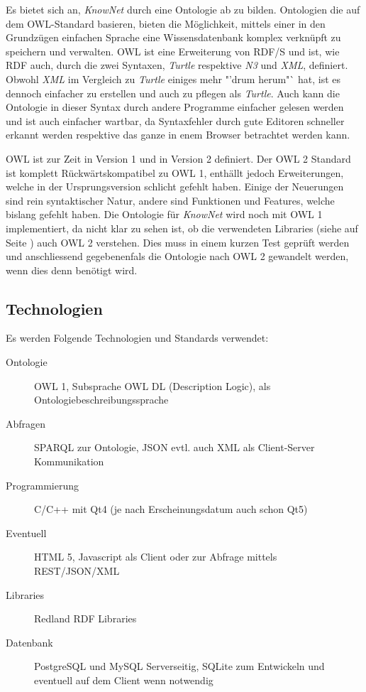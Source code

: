 \documentclass[
    11pt,
    latin1,
    a4paper,
    oneside
]{scrreprt}
\let\oldemph=\emph
\renewcommand{\emph}[1]{\index{#1}\oldemph{#1}}
\begin{document}
Es bietet sich an, \emph{KnowNet} durch eine Ontologie ab zu bilden. Ontologien die auf dem OWL-Standard\cite{W3COWL} basieren, bieten die M\"oglichkeit, mittels einer in den Grundz\"ugen einfachen Sprache eine Wissensdatenbank komplex verkn\"upft zu speichern und verwalten. OWL ist eine Erweiterung von RDF/S und ist, wie RDF auch, durch die zwei Syntaxen, \emph{Turtle} respektive \emph{N3} und \emph{XML}, definiert. Obwohl \emph{XML} im Vergleich zu \emph{Turtle} einiges mehr "'drum herum"` hat, ist es dennoch einfacher zu erstellen und auch zu pflegen als \emph{Turtle}. Auch kann die Ontologie in dieser Syntax durch andere Programme einfacher gelesen werden und ist auch einfacher wartbar, da Syntaxfehler durch gute Editoren schneller erkannt werden respektive das ganze in enem Browser betrachtet werden kann.

OWL ist zur Zeit in Version 1 und in Version 2 definiert. Der OWL 2 Standard\cite{W3COWL2} ist komplett R\"uckw\"artskompatibel zu OWL 1, enth\"allt jedoch Erweiterungen, welche in der Ursprungsversion schlicht gefehlt haben. Einige der Neuerungen sind rein syntaktischer Natur, andere sind Funktionen und Features, welche bislang gefehlt haben. Die Ontologie f\"ur \emph{KnowNet} wird noch mit OWL 1 implementiert, da nicht klar zu sehen ist, ob die verwendeten Libraries (siehe  auf Seite \pageref{sec:technologies}) auch OWL 2 verstehen. Dies muss in einem kurzen Test gepr\"uft werden und anschliessend gegebenenfals die Ontologie nach OWL 2 gewandelt werden, wenn dies denn ben\"otigt wird.

\subsection{Technologien} \label{sec:technologies}

Es werden Folgende Technologien und Standards verwendet:

\begin{description}
  \item[Ontologie] OWL 1, Subsprache OWL DL (Description Logic), als Ontologiebeschreibungssprache
  \item[Abfragen] SPARQL\cite{SPARQL} zur Ontologie, JSON evtl. auch XML als Client-Server Kommunikation
  \item[Programmierung] C/C++ mit Qt4\cite{QT} (je nach Erscheinungsdatum auch schon Qt5)
  \item[Eventuell] HTML 5, Javascript als Client oder zur Abfrage mittels REST/JSON/XML
  \item[Libraries] Redland RDF Libraries\cite{LIBRDF}
  \item[Datenbank] PostgreSQL und MySQL Serverseitig, SQLite zum Entwickeln und eventuell auf dem Client wenn notwendig
\end{description}
\end{document}
